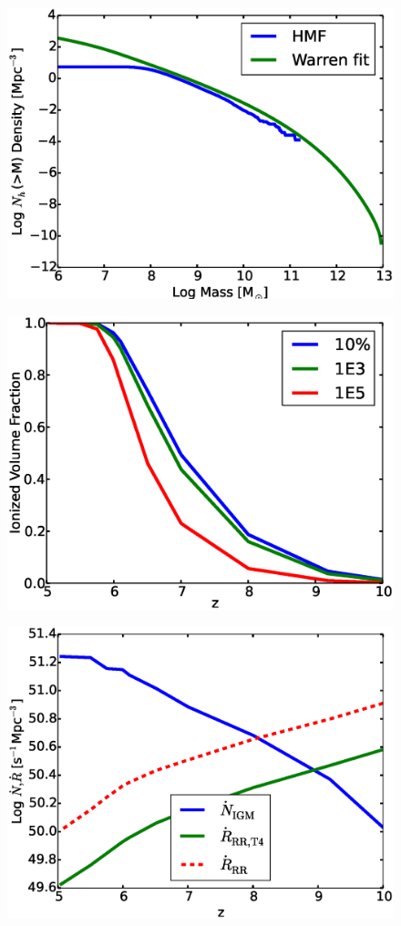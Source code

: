 \documentclass[letterpaper,10pt]{article}
\renewcommand{\(}{\left(}
\renewcommand{\)}{\right)}
\begin{document}
\begin{figure}
	\includegraphics[scale=0.45]{HD14475_HMF.eps}
\end{figure}
\begin{figure}
	\includegraphics[scale=0.45]{Ionized_vs_Redshift.eps}
\end{figure}
\begin{figure}
	\includegraphics[scale=0.45]{Shull_thresholded.eps}
\end{figure}
\end{document}
